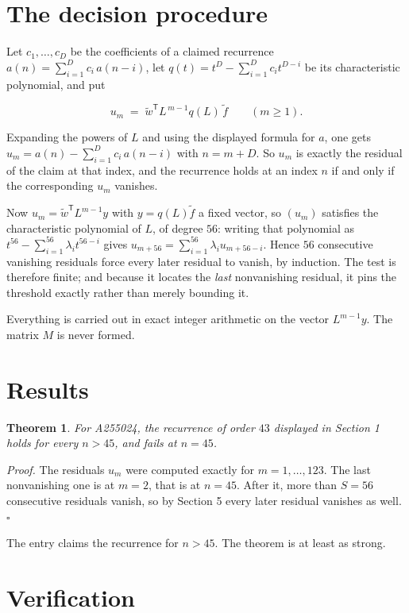 \documentclass[11pt]{article}
\newtheorem{theorem}{Theorem}
\theoremstyle{definition}
\begin{document}
\section{The decision procedure}

Let $c_1,\dots,c_D$ be the coefficients of a claimed recurrence $a(n) = \sum_{i=1}^{D} c_i\,a(n-i)$, let $q(t) = t^{D} - \sum_{i=1}^{D} c_i t^{D-i}$ be its characteristic polynomial, and put

\[u_m \;=\; \tilde w^{\mathsf T} L^{\,m-1} q(L)\,\tilde f \qquad (m \ge 1).\]

Expanding the powers of $L$ and using the displayed formula for $a$, one gets $u_m = a(n) - \sum_{i=1}^{D} c_i\,a(n-i)$ with $n = m + D$. So $u_m$ is exactly the residual of the claim at that index, and the recurrence holds at an index $n$ if and only if the corresponding $u_m$ vanishes.

Now $u_m = \tilde w^{\mathsf T} L^{m-1} y$ with $y = q(L)\tilde f$ a fixed vector, so $(u_m)$ satisfies the characteristic polynomial of $L$, of degree $56$: writing that polynomial as $t^{56} - \sum_{i=1}^{56} \lambda_i t^{56-i}$ gives $u_{m+56} = \sum_{i=1}^{56} \lambda_i u_{m+56-i}$. Hence $56$ consecutive vanishing residuals force every later residual to vanish, by induction. The test is therefore finite; and because it locates the {\itshape last} nonvanishing residual, it pins the threshold exactly rather than merely bounding it.

Everything is carried out in exact integer arithmetic on the vector $L^{m-1}y$. The matrix $M$ is never formed.

\section{Results}

\begin{theorem} For A255024, the recurrence of order $43$ displayed in Section 1 holds for every $n > 45$, and fails at $n = 45$.\end{theorem}

{\itshape Proof.} The residuals $u_m$ were computed exactly for $m = 1,\dots,123$. The last nonvanishing one is at $m = 2$, that is at $n = 45$. After it, more than $S = 56$ consecutive residuals vanish, so by Section 5 every later residual vanishes as well. $\square$

The entry claims the recurrence for $n > 45$. The theorem is at least as strong.

\section{Verification}
\end{document}
